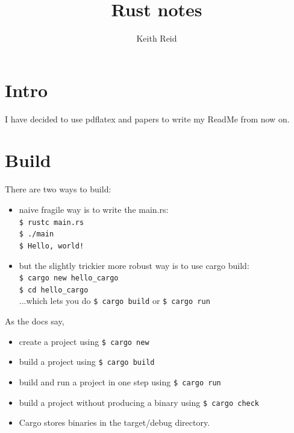 \documentclass[10pt,a4paper]{article}
\title{Rust notes}
\author{Keith Reid}
\begin{document}
\maketitle{}
\section{Intro}
I have decided to use pdflatex and papers to write my ReadMe from now on.

\section{Build}
There are two ways to build:
\begin{itemize}
  \item naive fragile way is to write the main.rs:\\
    \texttt{\$ rustc main.rs}\\
    \texttt{\$ ./main}\\
    \texttt{\$ Hello, world!}\\

  \item but the slightly trickier more robust way is to use cargo build:\\
    \texttt{\$ cargo new hello\_cargo}\\
    \texttt{\$ cd hello\_cargo}\\
    ...which lets you do \texttt{\$ cargo build} or \texttt{\$ cargo run}
\end{itemize}

As the docs say, 

\begin{itemize}
  \item create a project using \texttt{\$ cargo new}
  \item build a project using \texttt{\$ cargo build}
  \item build and run a project in one step using \texttt{\$ cargo run}
  \item build a project without producing a binary using \texttt{\$ cargo check}
   \item Cargo stores binaries in the target/debug directory.
\end{itemize}
\end{document}
